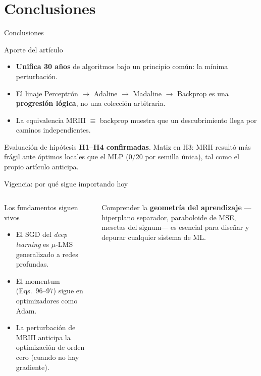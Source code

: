 \documentclass[aspectratio=169, 11pt, xcolor={dvipsnames,table}]{beamer}
\newcommand{\azul}[1]{\textcolor{UsachAzul}{#1}}
\begin{document}
\section{Conclusiones}

\begin{frame}{Conclusiones}
\begin{block}{Aporte del artículo}
\begin{itemize}
  \item \textbf{Unifica 30 años} de algoritmos bajo un principio común: la \azul{mínima perturbación}.
  \item El linaje Perceptrón $\to$ Adaline $\to$ Madaline $\to$ Backprop es una \textbf{progresión lógica}, no una colección arbitraria.
  \item La equivalencia \azul{MRIII $\equiv$ backprop} muestra que un descubrimiento llega por caminos independientes.
\end{itemize}
\end{block}
\begin{alertblock}{Evaluación de hipótesis}
\textbf{H1--H4 confirmadas}. Matiz en H3: MRII resultó más frágil ante óptimos locales que el MLP
(0/20 por semilla única), tal como el propio artículo anticipa.
\end{alertblock}
\end{frame}

\begin{frame}{Vigencia: por qué sigue importando hoy}
\begin{columns}[T]
\begin{block}{Los fundamentos siguen vivos}
\begin{itemize}
  \item El \azul{SGD} del \emph{deep learning} es $\mu$-LMS generalizado a redes profundas.
  \item El \azul{momentum} (Eqs.~96--97) sigue en optimizadores como Adam.
  \item La perturbación de MRIII anticipa la \azul{optimización de orden cero} (cuando no hay gradiente).
\end{itemize}
\end{block}
\begin{ideaclave}
Comprender la \textbf{geometría del aprendizaje} —hiperplano separador, paraboloide de MSE, mesetas
del signum— es esencial para diseñar y depurar cualquier sistema de ML.
\end{ideaclave}
\end{columns}
\end{frame}
\end{document}

